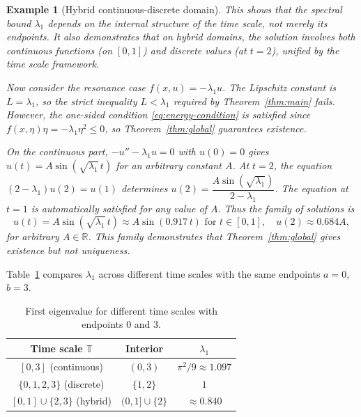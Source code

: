 \documentclass{article}
\newtheorem{example}[theorem]{Example}
\numberwithin{equation}{section}
\numberwithin{theorem}{section}
\begin{document}
\begin{example}[Hybrid continuous-discrete domain]
This shows that the spectral bound $\lambda_1$ depends on the internal structure of the time scale, not merely its endpoints. It also demonstrates that on hybrid domains, the solution involves both continuous functions (on $[0,1]$) and discrete values (at $t = 2$), unified by the time scale framework.

Now consider the resonance case $f(x,u) = -\lambda_1 u$. The Lipschitz constant is $L = \lambda_1$, so the strict inequality $L < \lambda_1$ required by Theorem~\ref{thm:main} fails. However, the one-sided condition \eqref{eq:energy-condition} is satisfied since $f(x,\eta)\eta = -\lambda_1\eta^2 \leq 0$, so Theorem~\ref{thm:global} guarantees existence.

On the continuous part, $-u'' - \lambda_1 u = 0$ with $u(0) = 0$ gives $u(t) = A\sin(\sqrt{\lambda_1}\, t)$ for an arbitrary constant $A$. At $t = 2$, the equation $(2 - \lambda_1)u(2) = u(1)$ determines
$u(2) = \dfrac{A\sin(\sqrt{\lambda_1})}{2 - \lambda_1}$. The equation at $t = 1$ is automatically satisfied for any value of $A$. Thus the family of solutions is
\[u(t) = A\sin(\sqrt{\lambda_1}\, t) \approx A\sin(0.917\, t) \text{ for } t \in [0,1], \quad u(2) \approx 0.684 A,\]
for arbitrary $A \in \mathbb{R}$. This family demonstrates that Theorem~\ref{thm:global} gives existence but not uniqueness.
\end{example}

Table~\ref{tab:comparison} compares $\lambda_1$ across different time scales with the same endpoints $a = 0$, $b = 3$.

\begin{table}[h]
\centering
\begin{tabular}{|c|c|c|}
\hline
Time scale $\mathbb{T}$ & Interior & $\lambda_1$ \\
\hline
$[0,3]$ (continuous) & $(0,3)$ & $\pi^2/9 \approx 1.097$ \\
\hline
$\{0,1,2,3\}$ (discrete) & $\{1,2\}$ & $1$ \\
\hline
$[0,1] \cup \{2,3\}$ (hybrid) & $(0,1] \cup \{2\}$ & $\approx 0.840$ \\
\hline
\end{tabular}
\caption{First eigenvalue for different time scales with endpoints $0$ and $3$.}
\label{tab:comparison}
\end{table}
\end{document}
